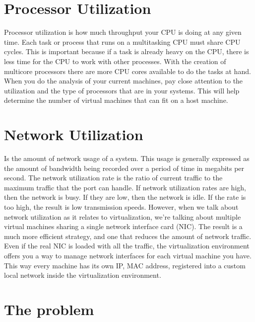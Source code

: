 \vspace{5mm}
\section{Processor Utilization}
\vspace{5mm}

Processor utilization is how much throughput your CPU is doing at any given time. Each
task or process that runs on a multitasking CPU must share CPU cycles. This is important because if a task is already heavy on the CPU, there is less time for the CPU to work
with other processes. With the creation of multicore processors there are more CPU cores available to do the tasks at hand. When you do the analysis of your current machines, pay
close attention to the utilization and the type of processors that are in your systems. This will help determine the number of virtual machines that can fit on a host machine.

\vspace{5mm}
\section{Network Utilization}
\vspace{5mm}

Is the amount of network usage of a system. This usage is generally expressed as the amount of bandwidth being recorded over a period of time in megabits per second. 
The network utilization rate is the ratio of current traffic to the maximum traffic that the port can handle. If network utilization rates are high, then the network is busy. If they are
low, then the network is idle. If the rate is too high, the result is low transmission speeds. However, when we talk about network utilization as it relates to virtualization, 
we’re talking about multiple virtual machines sharing a single network interface card (NIC). The result is a much more efficient strategy, and one that reduces the amount of network traffic. Even if the real NIC is loaded with all the traffic, the virtualization environment offers you a way to manage network interfaces for each virtual machine you have. This way every machine has its own IP, MAC address, registered into a custom local network inside the virtualization environment.

\vspace{5mm}
\section{The problem}
\vspace{5mm}

